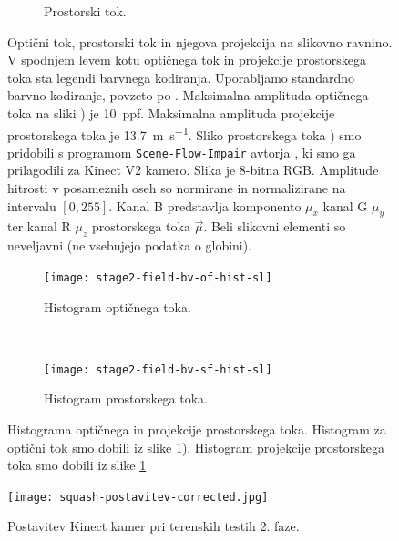 \begin{figure}[!htb]
\begin{subfigure}[t]{0.3\columnwidth}
		\caption{Prostorski tok.}
	\end{subfigure}
	\caption[Optični tok, prostorski tok in njegova projekcija]{Optični tok, prostorski tok in njegova projekcija na slikovno ravnino. V spodnjem levem kotu optičnega tok in projekcije prostorskega toka sta legendi barvnega kodiranja. Uporabljamo standardno barvno kodiranje, povzeto po \cite{baker2011database}. Maksimalna amplituda optičnega toka na sliki  ) je  \SI{10}{ppf}. Maksimalna amplituda projekcije prostorskega toka je \SI{13.7}{\m\per\s}. Sliko prostorskega toka ) smo pridobili s programom \texttt{Scene-Flow-Impair} avtorja \cite{jaimez2015primal}, ki smo ga prilagodili za Kinect V2 kamero. Slika je 8-bitna RGB. Amplitude hitrosti v posameznih oseh so normirane in normalizirane na intervalu $[0,255]$. Kanal B predstavlja komponento $\mu_x$ kanal G $\mu_y$ ter kanal R $\mu_z$ prostorskega toka $\vec{\mu}$. Beli slikovni elementi so neveljavni (ne vsebujejo podatka o globini).}
	\label{fig:stage2-field-sfof}
\end{figure}



\begin{figure}[!htb]
	\centering
	\begin{subfigure}[t]{0.45\columnwidth}
		\texttt{[image: stage2-field-bv-of-hist-sl]}
		\caption{Histogram optičnega toka.}
	\end{subfigure}
	~
	\begin{subfigure}[t]{0.45\columnwidth}
		\texttt{[image: stage2-field-bv-sf-hist-sl]}
		\caption{Histogram prostorskega toka.}
	\end{subfigure}
	\caption[Histograma optičnega in projekcije prostorskega toka]{Histograma optičnega in projekcije prostorskega toka. Histogram za optični tok smo dobili iz slike \ref{fig:stage2-field-sfof}). Histogram projekcije prostorskega toka smo dobili iz slike \ref{fig:stage2-field-sfof}}
	\label{fig:stage2-field-hist}
\end{figure}



\begin{figure}[!htb]
	\centering
		\texttt{[image: squash-postavitev-corrected.jpg]}	
	\caption[Postavitev Kinect kamer pri terenskih testih 2. faze]{Postavitev Kinect kamer pri terenskih testih 2. faze.}
	\label{fig:field-postavitev-kamer}
\end{figure}


